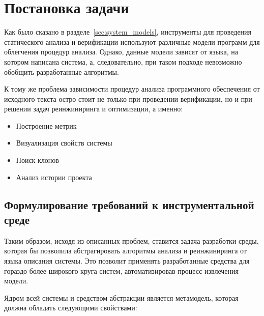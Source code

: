 \chapter{Постановка задачи}
\label{chap:task}
Как было сказано в разделе~\ref{sec:system_models}, инструменты для проведения
статического анализа и верификации используют различные модели программ для
облегчения процедур анализа. Однако, данные модели зависят от языка, на котором
написана система, а, следовательно, при таком подходе невозможно обобщить
разработанные алгоритмы.

К тому же проблема зависимости процедур анализа программного обеспечения от
исходного текста остро стоит не только при проведении верификации, но и при
решении задач реинжиниринга и оптимизации, а именно:

\begin{itemize}
    \item Построение метрик
    \item Визуализация свойств системы
    \item Поиск клонов
    \item Анализ истории проекта
\end{itemize}

\section{Формулирование требований к инструментальной среде}

Таким образом, исходя из описанных проблем, ставится задача разработки среды,
которая бы позволила абстрагировать алгоритмы анализа и реинжиниринга от языка
описания системы. Это позволит применять разработанные средства для гораздо
более широкого круга систем, автоматизировав процесс извлечения модели.

Ядром всей системы и средством абстракции является метамодель, которая должна
обладать следующими свойствами:


